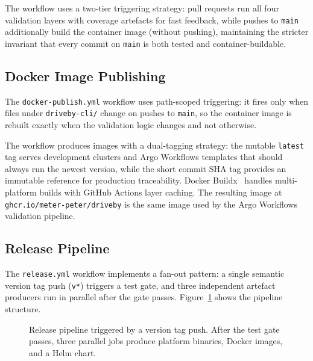 The workflow uses a two-tier triggering strategy: pull requests run all four validation layers with coverage artefacts for fast feedback, while pushes to \texttt{main} additionally build the container image (without pushing), maintaining the stricter invariant that every commit on \texttt{main} is both tested and container-buildable.

\subsection{Docker Image Publishing}
\label{subsec:docker-publish}

The \texttt{docker-publish.yml} workflow uses path-scoped triggering: it fires only when files under \texttt{driveby-cli/} change on pushes to \texttt{main}, so the container image is rebuilt exactly when the validation logic changes and not otherwise.

The workflow produces images with a dual-tagging strategy: the mutable \texttt{latest} tag serves development clusters and Argo Workflows templates that should always run the newest version, while the short commit SHA tag provides an immutable reference for production traceability. Docker Buildx~\cite{docker-buildx} handles multi-platform builds with GitHub Actions layer caching. The resulting image at \texttt{ghcr.io/meter-peter/driveby} is the same image used by the Argo Workflows validation pipeline.

\subsection{Release Pipeline}
\label{subsec:release-pipeline}

The \texttt{release.yml} workflow implements a fan-out pattern: a single semantic version tag push (\texttt{v*}) triggers a test gate, and three independent artefact producers run in parallel after the gate passes. Figure~\ref{fig:release-pipeline} shows the pipeline structure.

\begin{figure}[htbp]
\centering
\resizebox{\textwidth}{!}{%
%
}
\caption{Release pipeline triggered by a version tag push. After the test gate passes, three parallel jobs produce platform binaries, Docker images, and a Helm chart.}
\label{fig:release-pipeline}
\end{figure}

